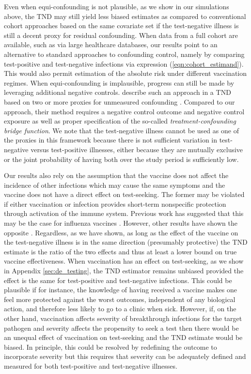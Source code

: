 \documentclass[11pt]{article}
\begin{document}
Even when equi-confounding is not plausible, as we show in our simulations above, the TND may still yield less biased estimates as compared to conventional cohort approaches based on the same covariate set if the test-negative illness is still a decent proxy for residual confounding. When data from a full cohort are available, such as via large healthcare databases, our results point to an alternative to standard approaches to confounding control, namely by comparing test-positive and test-negative infections via expression (\ref{eqn:cohort_estimand}). This would also permit estimation of the absolute risk under different vaccination regimes. When equi-confounding is implausible, progress can still be made by leveraging additional negative controls. \citeauthor{li_double_2023} describe such an approach in a TND based on two or more proxies for unmeasured confounding \cite{li_double_2023}. Compared to our approach, their method requires a negative control outcome and negative control exposure as well as proper specification of the so-called \textit{treatment-confounding bridge function}. We note that the test-negative illness cannot be used as one of the proxies in this framework because there is not sufficient variation in test-negative versus test-positive illnesses, either because they are mutually exclusive or the joint probability of having both over the study period is sufficiently low.

Our results also rely on the assumption that the vaccine does not affect the incidence of other infections which may cause the same symptoms and the vaccine does not have a direct effect on test-seeking. The former may be violated if either vaccination or infection provides short-term nonspecific protection through activation of the immune system. Previous work has suggested that this may be the case for influenza vaccines \cite{cowling_increased_2012}. However, other results have shown the opposite \cite{sundaram_influenza_2013}. Regardless, as we have shown, as long as the effect of the vaccine on the test-negative illness is in the same direction (presumably protective) the TND estimate is the ratio of the two effects and thus at least a lower bound on true vaccine effectiveness. When vaccination has an effect on test-seeking, as we show in Appendix \ref{sec:de_testing}, the TND estimator remains unbiased provided the effect is the same for test-positive and test-negative infections. This could be plausible if for instance, the knowledge of having received a vaccine makes one feel more protected against the worst outcomes, independent of any biological action, and therefore less likely to go to a clinic when sick. However, if, on the other hand, vaccination affects severity of breakthrough infections for the target pathogen and severity affects the propensity to seek a test then there would be an unequal effect of vaccination on test-seeking and the TND estimate would be biased. In principle, this could be resolved by redefining the outcome to incorporate severity but this requires that severity can be adequately defined and measured for both test-positive and test-negative illnesses. 
\end{document}
